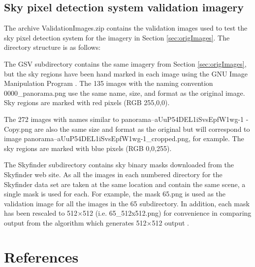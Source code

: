\documentclass[final,3p,times,authoryear]{elsarticle}
\begin{document}
\subsection{Sky pixel detection system validation imagery}\label{sec:valImages}

The archive ValidationImages.zip contains the validation images used to test the \cite{Nice2019UC} sky pixel detection system for the imagery in Section \ref{sec:origImages}. The directory structure is as follows:


The GSV subdirectory contains the same imagery from Section \ref{sec:origImages}, but the sky regions have been hand marked in each image using the GNU Image Manipulation Program \citep{GIMP2019}. The 135 images with the naming convention 0000\_panorama.png use the same name, size, and format as the original image. Sky regions are marked with red pixels (RGB 255,0,0). 

The 272 images with names similar to panorama--aUuP54DEL1iSvsEpfW1wg-1 - Copy.png are also the same size and format as the original but will correspond to image  panorama--aUuP54DEL1iSvsEpfW1wg-1\_cropped.png, for example. The sky regions are marked with blue pixels (RGB 0,0,255).

The Skyfinder subdirectory contains sky binary masks downloaded from the Skyfinder web site. As all the images in each numbered directory for the Skyfinder data set are taken at the same location and contain the same scene, a single mask is used for each. For example, the mask 65.png is used as the validation image for all the images in the 65 subdirectory. In addition, each mask has been rescaled to 512$\times$512 (i.e. 65\_512x512.png) for convenience in comparing output from the \cite{Middel2018} algorithm which generates 512$\times$512 output .



\section*{References}
 


\appendix
\setcounter{table}{0}
\renewcommand{\thetable}{A\arabic{table}}
\end{document}
